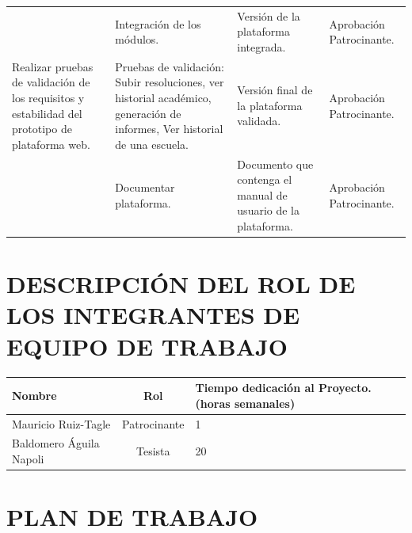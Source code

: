\documentclass[12pt]{article}
\begin{document}
\begin{center}
\begin{longtable}{|p{4cm}|p{4cm}|p{3cm}|p{4cm}|}
		
		
	
		
		
		
		& Integración de los módulos.		& Versión de la plataforma integrada. & Aprobación Patrocinante.\\ 		\cline{2-4}
		
		Realizar pruebas de validación de los requisitos y estabilidad del prototipo de plataforma web.
		& Pruebas de validación: Subir resoluciones, ver historial académico, generación de informes, Ver historial de una escuela. & Versión final de la plataforma validada.& Aprobación Patrocinante.\\ \cline{2-4}
		& Documentar plataforma. & Documento que contenga el manual de usuario de la plataforma. & Aprobación Patrocinante.\\ \hline 
		
		
	
		
		
		
	\end{longtable}
\end{center}
\section{DESCRIPCIÓN DEL ROL DE LOS INTEGRANTES DE EQUIPO DE TRABAJO}
	
		\begin{tabular}{|l|c|p{6cm}|} \hline
			
			Nombre & Rol & Tiempo dedicación al Proyecto. (horas semanales)\\ \hline
			Mauricio Ruiz-Tagle & Patrocinante & 1 \\ \hline
		
			Baldomero Águila Napoli & Tesista &20 \\ \hline
			
		\end{tabular}

	\newpage
\section{PLAN DE TRABAJO }
\end{document}
